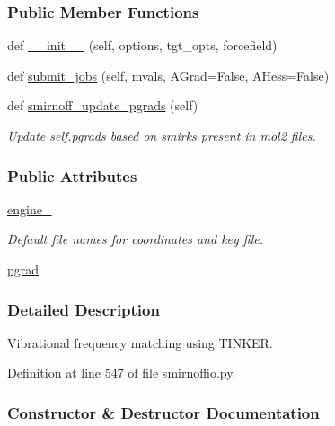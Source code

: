 \subsubsection*{Public Member Functions}
\begin{DoxyCompactItemize}
\item 
def \hyperlink{classsrc_1_1smirnoffio_1_1Vibration__SMIRNOFF_a8c258f46d442919b9d70ce89c8139271}{\+\_\+\+\_\+init\+\_\+\+\_\+} (self, options, tgt\+\_\+opts, forcefield)
\item 
def \hyperlink{classsrc_1_1smirnoffio_1_1Vibration__SMIRNOFF_a6a03b295bc983ec7ab3c0896d5210669}{submit\+\_\+jobs} (self, mvals, A\+Grad=False, A\+Hess=False)
\item 
def \hyperlink{classsrc_1_1smirnoffio_1_1Vibration__SMIRNOFF_a210c06bf1e21c3c93e584eef9256ef0c}{smirnoff\+\_\+update\+\_\+pgrads} (self)
\begin{DoxyCompactList}\small\item\em Update self.\+pgrads based on smirks present in mol2 files. \end{DoxyCompactList}\end{DoxyCompactItemize}
\subsubsection*{Public Attributes}
\begin{DoxyCompactItemize}
\item 
\hyperlink{classsrc_1_1smirnoffio_1_1Vibration__SMIRNOFF_ae816bc8526d9e8d544b99fb80e18169f}{engine\+\_\+}
\begin{DoxyCompactList}\small\item\em Default file names for coordinates and key file. \end{DoxyCompactList}\item 
\hyperlink{classsrc_1_1smirnoffio_1_1Vibration__SMIRNOFF_acfb70b534dea9dd0647bbcd908643dc8}{pgrad}
\end{DoxyCompactItemize}


\subsubsection{Detailed Description}
Vibrational frequency matching using T\+I\+N\+K\+ER. 



Definition at line 547 of file smirnoffio.\+py.



\subsubsection{Constructor \& Destructor Documentation}
\mbox{\label{classsrc_1_1smirnoffio_1_1Vibration__SMIRNOFF_a8c258f46d442919b9d70ce89c8139271}} 
